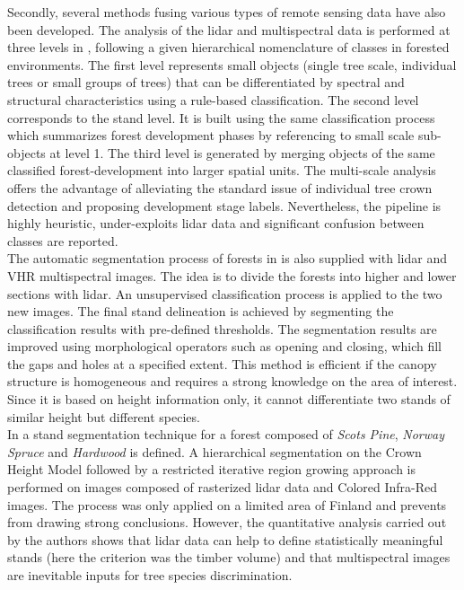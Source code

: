 Secondly, several methods fusing various types of remote sensing data have also been developed.
The analysis of the lidar and multispectral data is performed at three levels in \citep{tiede2004object}, following a given hierarchical nomenclature of classes in forested environments. The first level represents small objects (single tree scale, individual trees or small groups of trees) that can be differentiated by spectral and structural characteristics using a rule-based classification. The second level corresponds to the stand level. It is built using the same classification process which summarizes forest development phases by referencing to small scale sub-objects at level 1. The third level is generated by merging objects of the same classified forest-development into larger spatial units. The multi-scale analysis offers the advantage of alleviating the standard issue of individual tree crown detection and proposing development stage labels. Nevertheless, the pipeline is highly heuristic, under-exploits lidar data and significant confusion between classes are reported.\\
The automatic segmentation process of forests in \citep{diedershagen2004automatic} is also supplied with lidar and VHR multispectral images. The idea is to divide the forests into higher and lower sections with lidar. An unsupervised classification process is applied to the two new images. The final stand delineation is achieved by segmenting the classification results with pre-defined thresholds. The segmentation results are improved using morphological operators such as opening and closing, which fill the gaps and holes at a specified extent. This method is efficient if the canopy structure is homogeneous and requires a strong knowledge on the area of interest. Since it is based on height information only, it cannot differentiate two stands of similar height but different species.\\
In \citep{leppanen2008automatic} a stand segmentation technique for a forest composed of \textit{Scots Pine}, \textit{Norway Spruce} and \textit{Hardwood} is defined. A hierarchical segmentation on the Crown Height Model followed by a restricted iterative region growing approach is performed on images composed of rasterized lidar data and Colored Infra-Red images. The process was only applied on a limited area of Finland and prevents from drawing strong conclusions. However, the quantitative analysis carried out by the authors shows that lidar data can help to define statistically meaningful stands (here the criterion was the timber volume) and that multispectral images are inevitable inputs for tree species discrimination. \\

